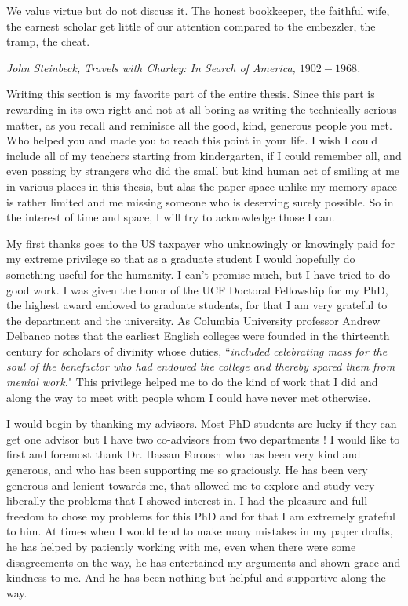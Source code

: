 \documentclass{UCF_ETD}
\begin{document}
\begin{acknowledgments}
\epigraph{We value virtue but do not discuss it. The honest bookkeeper, the faithful wife, the earnest scholar get little of our attention compared to the embezzler, the tramp, the cheat.}{ \itshape John Steinbeck, Travels with Charley: In Search of America, $1902 - 1968$. }


Writing this section is my favorite part of the entire thesis. Since this part is rewarding in its own right and not at all boring as writing the technically serious matter, as you recall and reminisce all the good, kind, generous people you met. Who helped you and made you to reach this point in your life. I wish I could include all of my teachers starting from kindergarten, if I could remember all, and even passing by strangers who did the small but kind human act of smiling at me in various places in this thesis, but alas the paper space unlike my memory space is rather limited and me missing someone who is deserving surely possible. So in the interest of time and space, I will try to acknowledge those I can. 

My first thanks goes to the US taxpayer who unknowingly or knowingly paid for my extreme privilege so that as a graduate student I would hopefully do something useful for the humanity. I can't promise much, but I have tried to do good work. I was given the honor of the UCF Doctoral Fellowship for my PhD, the highest award endowed to graduate students, for that I am very grateful to the department and the university. As Columbia University professor Andrew Delbanco notes that the earliest English colleges were founded in the thirteenth century for scholars of divinity whose duties, ``\emph{included celebrating mass for the soul of the benefactor who had endowed the college and thereby spared them from menial work.}" This privilege helped me to do the kind of work that I did and along the way to meet with people whom I could  have never met otherwise.

I would begin by thanking my advisors. Most PhD students are lucky if they can get one advisor but I have two co-advisors from two departments ! I would like to first and foremost thank Dr. Hassan Foroosh who has been very kind and generous, and who has been supporting me so graciously. He has been very generous and lenient towards me, that allowed me to explore and study very liberally the problems that I showed interest in. I had the pleasure and full freedom to chose my problems for this PhD and for that I am extremely grateful to him. At times when I would tend to make many mistakes in my paper drafts,  he has helped by patiently working with me, even when there were some disagreements on the way, he has entertained my arguments and shown grace and kindness to me. And he has been nothing but helpful and supportive along the way. 


\end{acknowledgments}
\end{document}

